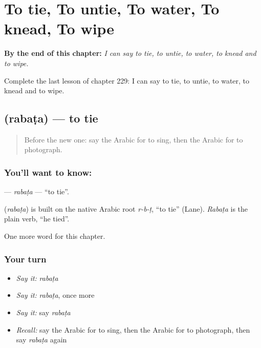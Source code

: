 
\chapter{To tie, To untie, To water, To knead, To wipe}
\label{ch:ar-to-tie-to-untie-to-water-to-knead-to-wipe}

\begin{chapteropening}
\textbf{By the end of this chapter:} \emph{I can say to tie, to untie, to water, to knead and to wipe.}

Complete the last lesson of chapter 229: I can say to tie, to untie, to water, to knead and to wipe.
\end{chapteropening}

\section[\texorpdfstring{\ar{ربط} (rabaṭa)}{ربط (rabaṭa)}]{ (rabaṭa) — to tie}

\label{lesson:AR-C229-rabata}



\begin{quote}
Before the new one: say the Arabic for to sing, then the Arabic for to photograph.
\end{quote}

\subsection*{You'll want to know: }
\textbf{} — \emph{rabaṭa} — \textquotedblleft{}to tie\textquotedblright{}.

\begin{cousinweb}
\textbf{} (\emph{rabaṭa}) is built on the native Arabic root \emph{r-b-ṭ}, \textquotedblleft{}to tie\textquotedblright{} (Lane). \emph{Rabaṭa} is the plain verb, \textquotedblleft{}he tied\textquotedblright{}.
\end{cousinweb}

\begin{grammarlens}[title={What you've built}]
One more word for this chapter.
\end{grammarlens}

\subsection*{Your turn}
\begin{itemize}
\raggedright
  \item \emph{Say it:} \emph{rabaṭa}
  \item \emph{Say it:} \emph{rabaṭa}, once more
  \item \emph{Say it:} say \emph{rabaṭa}
  \item \emph{Recall:} say the Arabic for to sing, then the Arabic for to photograph, then say \emph{rabaṭa} again
\end{itemize}


